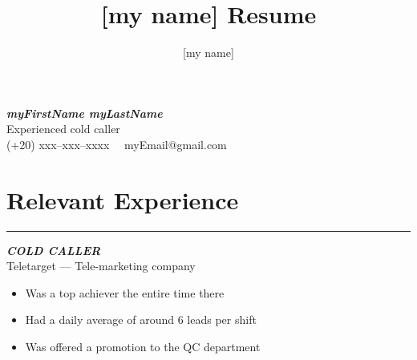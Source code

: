 \documentclass[10pt]{article}
\title{[my name] Resume}
\author{[my name]}
\date{}
\newcommand{\fancy}[1]{\Large\textbf{\textit{#1}}}
\begin{document}


\begin{center}
    \Large\fancy{myFirstName myLastName} \\
    \vspace{1em}
    Experienced cold caller\\
    \vspace{1em}
    (+20) xxx--xxx--xxxx \textbar\ \ myEmail@gmail.com \\ %
\end{center}
\vspace{1em}


\section*{Relevant Experience}
\hrule
\vspace{3em}
\begin{minipage}{0.7\textwidth}
 \fancy{COLD CALLER} \\
{\large Teletarget --- Tele-marketing company} \\
\begin{itemize}
    \item Was a top achiever the entire time there
    \item Had a daily average of around 6 leads per shift
    \item Was offered a promotion to the QC department
\end{itemize}   
\end{minipage}
\hspace{-2pt}
\end{document}
